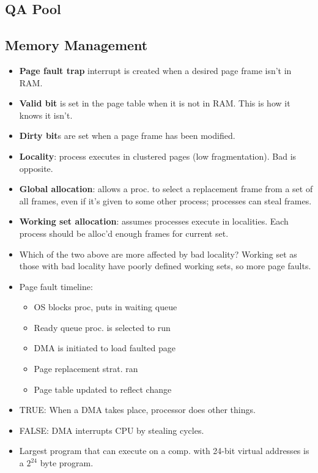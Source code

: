 \documentclass[fontsize=4.5pt]{scrartcl}
\begin{document}
\begin{multicols}{3}
    
  \section{QA Pool}
    \subsection{Memory Management}
      \begin{itemize}
        \item \textbf{Page fault trap} interrupt is created when a desired page frame isn't in RAM.
        \item \textbf{Valid bit} is set in the page table when it is not in RAM. This is how it knows it isn't.
        \item \textbf{Dirty bit}s are set when a page frame has been modified.
        \item \textbf{Locality}: process executes in clustered pages (low fragmentation). Bad is opposite.
        \item \textbf{Global allocation}: allows a proc. to select a replacement frame from a set of all frames, even if it's given to some other process; processes can steal frames.
        \item \textbf{Working set allocation}: assumes processes execute in localities. Each process should be alloc'd enough frames for current set.
        \item Which of the two above are more affected by bad locality? Working set as those with bad locality have poorly defined working sets, so more page faults.
        \item Page fault timeline:
        \begin{itemize}
          \item OS blocks proc, puts in waiting queue
          \item Ready queue proc. is selected to run
          \item DMA is initiated to load faulted page
          \item Page replacement strat. ran
          \item Page table updated to reflect change
        \end{itemize}
        \item TRUE: When a DMA takes place, processor does other things.
        \item FALSE: DMA interrupts CPU by stealing cycles.
        \item Largest program that can execute on a comp. with 24-bit virtual addresses is a $2^{24}$ byte program.

\end{itemize}
\end{multicols}
\end{document}
